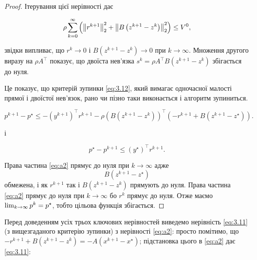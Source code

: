 \begin{proof}
    Ітерування цієї нерівності дає 

    \begin{equation*}
        \rho \operatorname*{\sum}_{k = 0}^\infty \left( \left\|r^{k + 1}\right\|_2^2 + \left\| B \left( z^{k + 1} - z^k \right) \right\|_2^2 \right) \le V^0,
    \end{equation*}

    звідки випливає, що $r^k \to 0$ і $B \left( z^{k + 1} - z^k \right) \to 0$ при $k \to \infty$. Множення другого виразу на $\rho A^\intercal$ показує, що двоїста нев'язка $s^k = \rho A^\intercal B \left( z^{k + 1} - z^k \right)$ збігається до нуля.

    \begin{remark}
        Це показує, що критерій зупинки \eqref{eq:3.12}, який вимагає одночасної малості прямої і двоїстої нев'язок, рано чи пізно таки виконається і алгоритм зупиниться.
    \end{remark}

    \begin{lemma*}
        \begin{equation}
            \label{eq:a2}
            p^{k + 1} - p^\star \le - \left( y^{k + 1} \right)^\intercal r^{k + 1} - \rho \left( B \left( z^{k + 1} - z^k \right) \right)^\intercal \left( -r^{k + 1} + B \left( z^{k + 1} - z^\star \right) \right).
        \end{equation}
    \end{lemma*}

    і
    
    \begin{lemma*}[третя]
        \begin{equation}
            \label{eq:a3}
            p^\star - p^{k + 1} \le \left( y^\star \right)^\intercal r^{k + 1}.
        \end{equation}
    \end{lemma*}

    Права частина \eqref{eq:a2} прямує до нуля при $k \to \infty$ адже $$B \left( z^{k + 1} - z^\star \right)$$ обмежена, і як $r^{k + 1}$ так і $B \left(z^{k + 1} - z^k \right)$ прямують до нуля. Права частина \eqref{eq:a2} прямує до нуля при $k \to \infty$ бо $r^k$ прямує до нуля. Отже маємо $\operatorname*{lim}_{k \to \infty} p^k = p^\star$, тобто цільова функція збігається.
\end{proof}

Перед доведенням усіх трьох ключових нерівностей виведемо нерівність \eqref{eq:3.11} (з вищезгаданого критерію зупинки) з нерівності \eqref{eq:a2}: просто помітимо, що $-r^{k + 1} + B \left( z^{k + 1} - z^k \right) = - A \left( x^{k + 1} - x^\star \right)$; підстановка цього в \eqref{eq:a2} дає \eqref{eq:3.11}:

